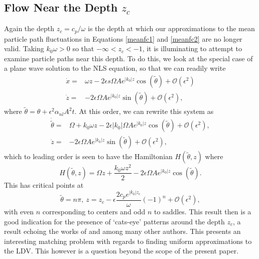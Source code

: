 \documentclass{JFM_Style/jfm}
\begin{document}
\subsection{Flow Near the Depth $z_{c}$}
Again the depth $z_{c}=c_{p}/\omega$ is the depth at which our approximations to the mean particle path fluctuations in Equations \eqref{meanfc1} and \eqref{meanfc2} are no longer valid.  Taking $k_{0}\omega >0$ so that $-\infty<z_{c}<-1$, it is illuminating to attempt to examine particle paths near this depth.  To do this, we look at the special case of a plane wave solution to the NLS equation, so that we can readily write 
\begin{align*}
\dot{x} = & \omega z - 2\epsilon s\Omega A e^{|k_{0}|z}\cos(\tilde{\theta}) + \mathcal{O}(\epsilon^{2})\\
\dot{z} = & -2\epsilon\Omega A e^{|k_{0}|z}\sin(\tilde{\theta}) + \mathcal{O}(\epsilon^{2}),
\end{align*}
where $\tilde{\theta} = \theta + \epsilon^{2}\alpha_{nl}A^{2}t$.  At this order, we can rewrite this system as 
\begin{align*}
\dot{\tilde{\theta}} = & \Omega+k_{0}\omega z - 2\epsilon |k_{0}|\Omega A e^{|k_{0}|z}\cos(\tilde{\theta}) + \mathcal{O}(\epsilon^{2}),\\
\dot{z} = & -2\epsilon\Omega A e^{|k_{0}|z}\sin(\tilde{\theta}) + \mathcal{O}(\epsilon^{2}),
\end{align*}
which to leading order is seen to have the Hamiltonian $H(\tilde{\theta},z)$ where
\[
H(\tilde{\theta},z) = \Omega z + \frac{k_{0}\omega z^{2}}{2} - 2\epsilon\Omega A e^{|k_{0}|z}\cos(\tilde{\theta}).
\]
This has critical points at 
\[
\tilde{\theta}=n \pi, ~ z = z_{c} - \epsilon\frac{2c_{p} e^{|k_{0}|z_{c}}}{\omega} (-1)^{n} + \mathcal{O}(\epsilon^{2}),
\]
with even $n$ corresponding to centers and odd $n$ to saddles.  This result then is a good indication for the presence of `cats-eye' patterns around the depth $z_{c}$, a result echoing the works of \cite{simmen,dasilva,wahlen2} and \cite{nachbin} among many other authors.  This presents an interesting matching problem with regards to finding uniform approximations to the LDV.  This however is a question beyond the scope of the present paper.
\end{document}

